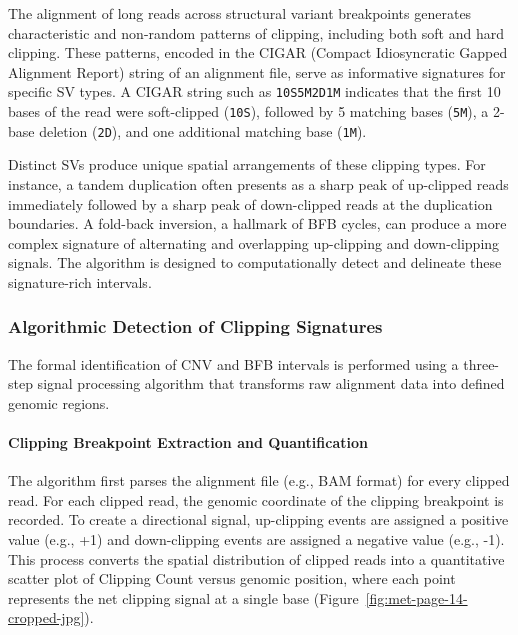\documentclass[pdflatex,sn-nature]{sn-jnl}
\begin{document}
The alignment of long reads across structural variant breakpoints generates characteristic and non-random patterns of clipping, including both soft and hard clipping. These patterns, encoded in the CIGAR (Compact Idiosyncratic Gapped Alignment Report) string of an alignment file, serve as informative signatures for specific SV types. A CIGAR string such as \texttt{10S5M2D1M} indicates that the first 10 bases of the read were soft-clipped (\texttt{10S}), followed by 5 matching bases (\texttt{5M}), a 2-base deletion (\texttt{2D}), and one additional matching base (\texttt{1M}).

Distinct SVs produce unique spatial arrangements of these clipping types. For instance, a tandem duplication often presents as a sharp peak of up-clipped reads immediately followed by a sharp peak of down-clipped reads at the duplication boundaries. A fold-back inversion, a hallmark of BFB cycles, can produce a more complex signature of alternating and overlapping up-clipping and down-clipping signals. The algorithm is designed to computationally detect and delineate these signature-rich intervals.

\subsubsection{Algorithmic Detection of Clipping Signatures}\label{algorithmic-detection-of-clipping-signatures}

The formal identification of CNV and BFB intervals is performed using a three-step signal processing algorithm that transforms raw alignment data into defined genomic regions.

\paragraph{Clipping Breakpoint Extraction and Quantification}\label{clipping-breakpoint-extraction-and-quantification}

The algorithm first parses the alignment file (e.g., BAM format) for every clipped read. For each clipped read, the genomic coordinate of the clipping breakpoint is recorded. To create a directional signal, up-clipping events are assigned a positive value (e.g., +1) and down-clipping events are assigned a negative value (e.g., -1). This process converts the spatial distribution of clipped reads into a quantitative scatter plot of Clipping Count versus genomic position, where each point represents the net clipping signal at a single base (Figure~\ref{fig:met-page-14-cropped-jpg}).
\end{document}
